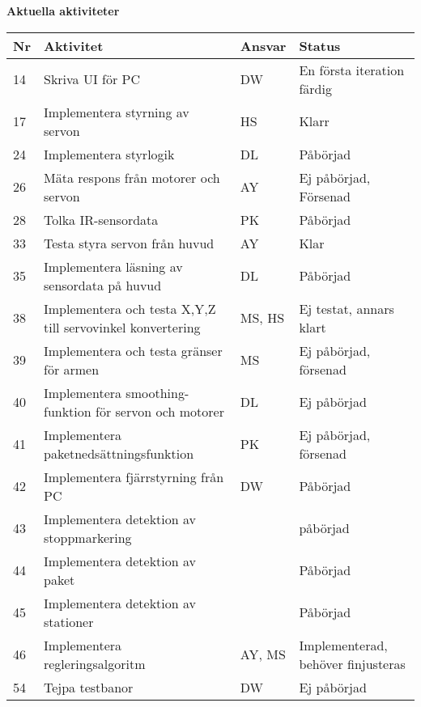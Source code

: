 \documentclass[titlepage, a4paper]{article}
\begin{document}
\newpage
\textbf{\Large Aktuella aktiviteter}
\begin{center}
\begin{tabularx}{\textwidth}{| p{4mm} | X | p{13.5mm} | X |}
	\hline
	\textbf{Nr} & \textbf{Aktivitet} & \textbf{Ansvar} & \textbf{Status} \\\hline	
	{14} & {Skriva UI för PC} & {DW} & {En första iteration färdig} \\\hline
	{17} & {Implementera styrning av servon} & {HS} & {Klarr} \\\hline
	{24} & {Implementera styrlogik} & {DL} & {Påbörjad} \\\hline
	{26} & {Mäta respons från motorer och servon} & {AY} & {Ej påbörjad, Försenad} \\\hline
	{28} & {Tolka IR-sensordata} & {PK} & {Påbörjad} \\\hline
	{33} & {Testa styra servon från huvud} & {AY} & {Klar} \\\hline
	{35} & {Implementera läsning av sensordata på huvud} & {DL} & {Påbörjad} \\\hline
	{38} & {Implementera och testa X,Y,Z  till servovinkel konvertering} & {MS, HS} & {Ej testat, annars klart} \\\hline
	{39} & {Implementera och testa gränser för armen} & {MS} & {Ej påbörjad, försenad} \\\hline
	{40} & {Implementera smoothing-funktion för servon och motorer} & {DL} & {Ej påbörjad} \\\hline
	{41} & {Implementera paketnedsättningsfunktion} & {PK} & {Ej påbörjad, försenad} \\\hline
	{42} & {Implementera fjärrstyrning från PC} & {DW} & {Påbörjad} \\\hline
	{43} & {Implementera detektion av stoppmarkering} & {} & {påbörjad} \\\hline
	{44} & {Implementera detektion av paket} & {} & {Påbörjad} \\\hline
	{45} & {Implementera detektion av stationer} & {} & {Påbörjad} \\\hline
	{46} & {Implementera regleringsalgoritm} & {AY, MS} & {Implementerad, behöver finjusteras} \\\hline
	{54} & {Tejpa testbanor} & {DW} & {Ej påbörjad} \\\hline
\end{tabularx}
\end{center}
\end{document}
